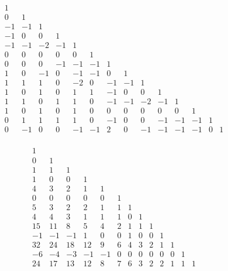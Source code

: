 \documentclass[12pt,reqno,a4letter]{article}
\numberwithin{figure}{section}
\numberwithin{table}{section}
\numberwithin{equation}{section}
\theoremstyle{plain}
\numberwithin{theorem}{section}
\theoremstyle{definition}
\begin{document}
\begin{figure}[ht!]

\begin{minipage}{\linewidth} 
\begin{center} 
\small
\begin{equation*} 
\boxed{ 
\begin{array}{cccccccccccccc}
1 & \\
0 & 1 & \\
-1 & -1 & 1 & \\
-1 & 0 & 0 & 1 & \\
-1 & -1 & -2 & -1 & 1 & \\
0 & 0 & 0 & 0 & 0 & 1 & \\
0 & 0 & 0 & -1 & -1 & -1 & 1 & \\
1 & 0 & -1 & 0 & -1 & -1 & 0 & 1 & \\
1 & 1 & 1 & 0 & -2 & 0 & -1 & -1 & 1 & \\
1 & 0 & 1 & 0 & 1 & 1 & -1 & 0 & 0 & 1 & \\
1 & 1 & 0 & 1 & 1 & 0 & -1 & -1 & -2 & -1 & 1 & \\
1 & 0 & 1 & 0 & 1 & 0 & 0 & 0 & 0 & 0 & 0 & 1 & \\
0 & 1 & 1 & 1 & 1 & 0 & -1 & 0 & 0 & -1 & -1 & -1 & 1 & \\
0 & -1 & 0 & 0 & -1 & -1 & 2 & 0 & -1 & -1 & -1 & -1 & 0 & 1 \\
\end{array}
}
\end{equation*}
\end{center} 
\end{minipage} 

\begin{minipage}{\linewidth} 
\begin{center} 
\small
\begin{equation*} 
\boxed{ 
\begin{array}{ccccccccccccc}
 1 & \\
 0 & 1 & \\
 1 & 1 & 1 & \\
 1 & 0 & 0 & 1 & \\
 4 & 3 & 2 & 1 & 1 & \\
 0 & 0 & 0 & 0 & 0 & 1 & \\
 5 & 3 & 2 & 2 & 1 & 1 & 1 & \\
 4 & 4 & 3 & 1 & 1 & 1 & 0 & 1 & \\
 15 & 11 & 8 & 5 & 4 & 2 & 1 & 1 & 1 & \\
 -1 & -1 & -1 & 1 & 0 & 0 & 1 & 0 & 0 & 1 & \\
 32 & 24 & 18 & 12 & 9 & 6 & 4 & 3 & 2 & 1 & 1 & \\
 -6 & -4 & -3 & -1 & -1 & 0 & 0 & 0 & 0 & 0 & 0 & 1 & \\
 24 & 17 & 13 & 12 & 8 & 7 & 6 & 3 & 2 & 2 & 1 & 1 & 1 \\
\end{array}
}
\end{equation*}
\end{center} 
\end{minipage} 


\end{figure}
\end{document}
